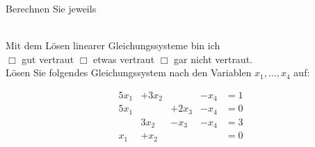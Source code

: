 \documentclass[12pt]{exam}
\begin{document}
\begin{questions}
Berechnen Sie jeweils\\~~\\



\pagebreak
{}

Mit dem Lösen linearer Gleichungssysteme bin ich\\ $\Box$ gut vertraut \hfill $\Box$ etwas vertraut \hfill $\Box$ gar nicht vertraut. \\[2ex]
L\"osen Sie folgendes Gleichungssystem nach den Variablen $x_1,\ldots,x_4$
auf:

\[\begin{array}{rrrrl}
5 x_1 &+ 3 x_2 &~      &-x_4 &=1 \\
5 x_1 &~       &+2 x_3 &-x_4 &=0 \\
~     &3 x_2   &-x_3   &-x_4 &=3 \\
x_1   &+ x_2   &~      &~    &=0
\end{array}\]
~~\\[40ex]
\pagebreak
{}


\end{questions}
\end{document}
